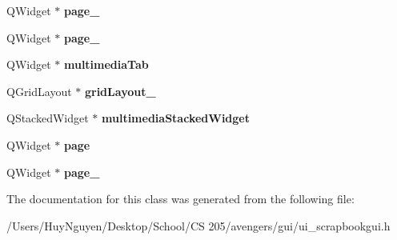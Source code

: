 \begin{DoxyCompactItemize}
\item 
Q\+Widget $\ast$ {\bfseries page\+\_}\hypertarget{classUi__ScrapbookGUI_a7a2bf47acd490051105be7139b1aba5c}{}\label{classUi__ScrapbookGUI_a7a2bf47acd490051105be7139b1aba5c}

\item 
Q\+Widget $\ast$ {\bfseries page\+\_}\hypertarget{classUi__ScrapbookGUI_a3df4779b6dcad3c4539d514a41ee14a7}{}\label{classUi__ScrapbookGUI_a3df4779b6dcad3c4539d514a41ee14a7}

\item 
Q\+Widget $\ast$ {\bfseries multimedia\+Tab}\hypertarget{classUi__ScrapbookGUI_a25fa636f3700322c3ed0a423effcaf88}{}\label{classUi__ScrapbookGUI_a25fa636f3700322c3ed0a423effcaf88}

\item 
Q\+Grid\+Layout $\ast$ {\bfseries grid\+Layout\+\_}\hypertarget{classUi__ScrapbookGUI_a127e9816595fc9403f98318995601067}{}\label{classUi__ScrapbookGUI_a127e9816595fc9403f98318995601067}

\item 
Q\+Stacked\+Widget $\ast$ {\bfseries multimedia\+Stacked\+Widget}\hypertarget{classUi__ScrapbookGUI_a0862ef53cc7624190bf8e2bd4842b38e}{}\label{classUi__ScrapbookGUI_a0862ef53cc7624190bf8e2bd4842b38e}

\item 
Q\+Widget $\ast$ {\bfseries page}\hypertarget{classUi__ScrapbookGUI_a2887671c4f4772f8a96631c9e76dd945}{}\label{classUi__ScrapbookGUI_a2887671c4f4772f8a96631c9e76dd945}

\item 
Q\+Widget $\ast$ {\bfseries page\+\_}\hypertarget{classUi__ScrapbookGUI_aafb8ba26c19789c8427ecf79e608e5c8}{}\label{classUi__ScrapbookGUI_aafb8ba26c19789c8427ecf79e608e5c8}

\end{DoxyCompactItemize}


The documentation for this class was generated from the following file\+:\begin{DoxyCompactItemize}
\item 
/\+Users/\+Huy\+Nguyen/\+Desktop/\+School/\+C\+S 205/avengers/gui/ui\+\_\+scrapbookgui.\+h\end{DoxyCompactItemize}

